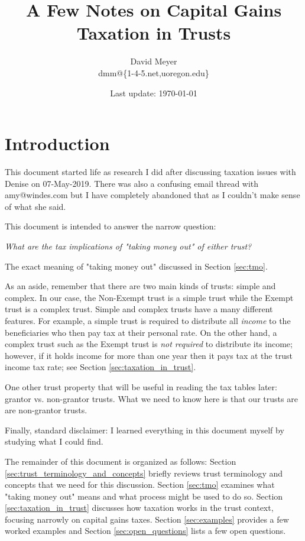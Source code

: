 \documentclass[11pt, oneside]{article}   	%
\title{A Few Notes on Capital Gains Taxation in Trusts}
\author{David Meyer \\ dmm@\{1-4-5.net,uoregon.edu\}}
\date{Last update: \today}							%
\theoremstyle{definition}
\begin{document}
\maketitle

\section{Introduction}

This document started life as research I did after discussing taxation issues with Denise on 07-May-2019. There was also a confusing email thread with amy@windes.com but 
I have completely abandoned that as I couldn't make sense of what she said.

\bigskip
\noindent
This document is intended to answer the narrow question: 

\bigskip
\noindent
\begin{center}
\emph{What are the tax implications of "taking money out" of either trust?} 
\end{center}

\bigskip
\noindent
The exact meaning of "taking money out" discussed in Section \ref{sec:tmo}.

\bigskip
\noindent
As an aside, remember that there are two main kinds of trusts: simple and complex. In our case, the Non-Exempt trust is a simple trust while the Exempt trust is a complex trust.
Simple and complex trusts have a many different features. 
For example, a simple trust is required to distribute all  \emph{income} to the beneficiaries who then pay tax at their personal rate.  On the other hand, a 
complex trust such as the Exempt trust is \emph{not required} to distribute its income; however, if it holds income for more than one year then it pays tax at the trust income 
tax rate; see Section \ref{sec:taxation_in_trust}.  

\bigskip
\noindent
One other trust property that will be useful in reading the tax tables later: grantor vs. non-grantor trusts. What we need to know here is that our trusts are
are non-grantor trusts.


\bigskip
\noindent
Finally, standard disclaimer: I learned everything in this document myself by studying what I could find. 

\bigskip
\noindent
The remainder of this document is organized as follows: Section \ref{sec:trust_terminology_and_concepts} briefly reviews trust terminology and concepts that we need for 
this discussion. Section \ref{sec:tmo} examines what "taking money out" means and what process might be used to do so. Section \ref{sec:taxation_in_trust} discusses
how taxation works in the trust context, focusing narrowly on capital gains taxes. Section \ref{sec:examples} provides a few worked examples and 
Section \ref{sec:open_questions} lists a few open questions.
\end{document}
